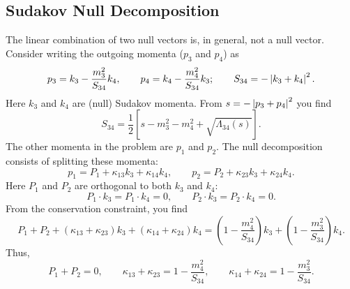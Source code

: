 \subsection{Sudakov Null Decomposition}
The linear combination of two null vectors is, in general, not a null vector. Consider writing the outgoing momenta ($p_{3}$ and $p_{4}$) as
\begin{equation}
	p_{3} = k_{3} - \frac{m_{3}^{2}}{S_{34}} k_{4}, \qquad p_{4} = k_{4} - \frac{m_{4}^{2}}{S_{34}} k_{3}; \qquad S_{34} = -\left\lvert k_{3} + k_{4} \right\rvert^{2}.
\end{equation}
Here $k_{3}$ and $k_{4}$ are (null) Sudakov momenta. From $s = -\left\lvert p_{3} + p_{4} \right\rvert^{2}$ you find
\begin{equation}
	S_{34} = \frac{1}{2} \left[ s - m_{3}^{2} - m_{4}^{2} + \sqrt{\Lambda_{34}(s)} \right].
\end{equation}
The other momenta in the problem are $p_{1}$ and $p_{2}$. The null decomposition consists of splitting these momenta:
\begin{equation}
	p_{1} = P_{1} + \kappa_{13} k_{3} + \kappa_{14} k_{4}, \qquad p_{2} = P_{2} + \kappa_{23} k_{3} + \kappa_{24} k_{4}.
\end{equation}
Here $P_{1}$ and $P_{2}$ are orthogonal to both $k_{3}$ and $k_{4}$:
\begin{equation}
	P_{1} \cdot k_{3} = P_{1} \cdot k_{4} = 0, \qquad P_{2} \cdot k_{3} = P_{2} \cdot k_{4} = 0.
\end{equation}
From the conservation constraint, you find
\begin{equation}
	P_{1} + P_{2} + \left( \kappa_{13} + \kappa_{23} \right) k_{3} + \left( \kappa_{14} + \kappa_{24} \right) k_{4} = \left(1 - \frac{m_{4}^{2}}{S_{34}} \right) k_{3} + \left(1 - \frac{m_{3}^{2}}{S_{34}} \right) k_{4}.
\end{equation}
Thus,
\begin{equation}
	P_{1} + P_{2} = 0, \qquad \kappa_{13} + \kappa_{23} = 1 - \frac{m_{4}^{2}}{S_{34}}, \qquad \kappa_{14} + \kappa_{24} = 1 - \frac{m_{3}^{2}}{S_{34}}.
\end{equation}
